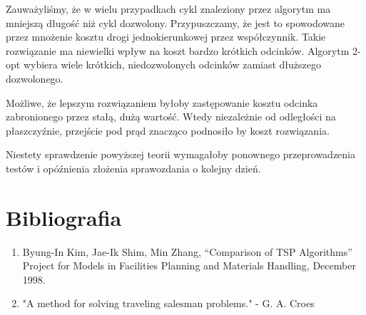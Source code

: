 \documentclass{article}
\begin{document}
Zauważyliśmy, że w wielu przypadkach cykl znaleziony przez algorytm ma mniejszą długość niż cykl dozwolony. Przypuszczamy, że jest to spowodowane przez mnożenie kosztu drogi jednokierunkowej przez współczynnik. Takie rozwiązanie ma niewielki wpływ na koszt bardzo krótkich odcinków. Algorytm 2-opt wybiera wiele krótkich, niedozwolonych odcinków zamiast dłuższego dozwolonego.

Możliwe, że lepszym rozwiązaniem byłoby zastępowanie kosztu odcinka zabronionego przez stałą, dużą wartość. Wtedy niezależnie od odległości na płaszczyźnie, przejście pod prąd znacząco podnosiło by koszt rozwiązania.

Niestety sprawdzenie powyższej teorii wymagałoby ponownego przeprowadzenia testów i opóźnienia złożenia sprawozdania o kolejny dzień.



\section{Bibliografia}


\begin{enumerate}
\item Byung-In Kim, Jae-Ik Shim, Min Zhang, “Comparison of TSP Algorithms” Project for Models in Facilities Planning and Materials Handling, December 1998. %
\item "A method for solving traveling salesman problems." - G. A. Croes
\end{enumerate}
\end{document}
